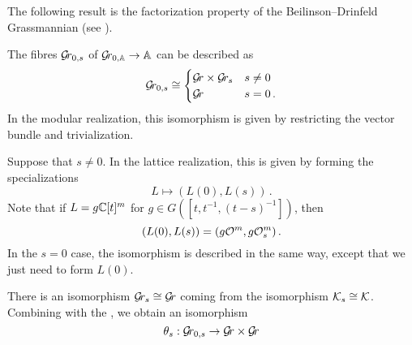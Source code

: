 \documentclass{article} %
\begin{document}
The following result is the factorization property of the Beilinson--Drinfeld Grassmannian (see \cite[Prop. 3.13]{zhu2016introduction}).
\begin{proposition}
    \label{pr:polyno-taylor}
    The fibres $ \mathcal{G}\!r_{0,s}$ of $ {\mathcal{G}\!r_{0,\mathbb A}} \rightarrow \mathbb A$ can be described as %
    \begin{equation*}
    \mathcal{G}\!r_{0,s} \cong 
        \begin{cases} 
            \mathcal{G}\!r \times \mathcal{G}\!r_s & s \ne 0 \\
            \mathcal{G}\!r              & s = 0\,.
        \end{cases}
    \end{equation*}
    In the modular realization, this isomorphism is given by restricting the vector bundle and trivialization.
    
    Suppose that $ s \ne 0 $. In the lattice realization, this is given by forming the specializations 
    $$
        L \mapsto (L(0), L(s))\,.
    $$
    Note that if $ L = g \mathbb C[t]^m$ for $ g \in G([t,t^{-1}, (t-s)^{-1}])$, then 
    $$
        (L(0), L(s)) = (g \mathcal O^m, g\mathcal O^m_s)\,. 
    $$
    In the $ s = 0 $ case, the isomorphism is described in the same way, except that we just need to form $ L(0)$.
\end{proposition}


    
    There is an isomorphism $ \mathcal{G}\!r_s \cong \mathcal{G}\!r $ coming from the isomorphism $ \mathcal K_s \cong \mathcal K$. 
    Combining with the , we obtain an isomorphism
    $$
    \theta_s : \mathcal{G}\!r_{0,s} \rightarrow \mathcal{G}\!r \times \mathcal{G}\!r 
    $$
\end{document}
